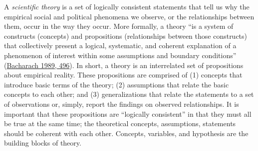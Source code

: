 \documentclass{book}
\begin{document}
A \emph{scientific theory} is a set of logically consistent statements that
tell us why the empirical social and political phenomena we observe, or the
relationships between them, occur in the way they occur. More formally, a
theory ``is a system of constructs (concepts) and propositions (relationships
between those constructs) that collectively present a logical, systematic, and
coherent explanation of a phenomenon of interest within some assumptions and
boundary conditions''
(\protect\hyperlink{ref-bacharachOrganizationalTheoriesCriteria}{Bacharach
1989, 496}). In short, a theory is an interrelated set of propositions about
empirical reality. These propositions are comprised of (1) concepts that
introduce basic terms of the theory; (2) assumptions that relate the basic
concepts to each other; and (3) generalizations that relate the statements to
a set of observations or, simply, report the findings on observed
relationships. It is important that these propositions are ``logically
consistent'' in that they must all be true at the same time; the theoretical
concepts, assumptions, statements should be coherent with each other.
Concepts, variables, and hypothesis are the building blocks of theory.
\end{document}
